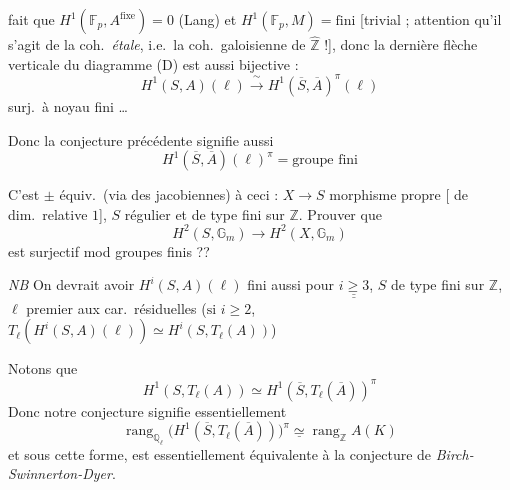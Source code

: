 \documentclass[11pt,a4paper]{article}
\begin{document}
fait que $H^{1}(\mathbb{F}_{p}, A^{\mathrm{fixe}}) = 0$ (Lang) et
$H^{1}(\mathbb{F}_{p}, M) = \text{fini}$ [trivial ; attention qu'il s'agit de
la coh.\ \emph{étale}, i.e.\ la coh.\ galoisienne de $\widehat{\mathbb{Z}}$ !],
donc la dernière flèche verticale du diagramme (D) est aussi bijective :
\[
  H^{1}(S, A)(\ell) \xrightarrow{\;\sim\;} H^{1}(\overline{S}, \overline{A})^{\pi}(\ell)
\]
surj.\ à noyau fini …

Donc la conjecture précédente signifie aussi
\[
  \boxed{\; H^{1}(\overline{S}, \overline{A})(\ell)^{\pi} = \text{groupe fini} \;}
\]

C'est  $\pm$ équiv.\ (via des jacobiennes) à ceci : $X \to S$
morphisme propre [ de dim.\ relative $1$], $S$ régulier et
de type fini sur $\mathbb{Z}$. Prouver que
\[
  H^{2}(S, \mathbb{G}_{m}) \longrightarrow H^{2}(X, \mathbb{G}_{m})
\]
est surjectif mod groupes finis ??

\emph{NB} On devrait avoir $H^{i}(S, A)(\ell)$ fini aussi pour
$\underline{\underline{i \geq 3}}$, $S$ de type fini sur $\mathbb{Z}$, $\ell$
premier aux car.\ résiduelles
 ($\text{si } i \geq 2$, $T_{\ell}(H^{i}(S, A)(\ell)) \simeq H^{i}(S, T_{\ell}(A))$)

Notons que
\[
  H^{1}(S, T_{\ell}(A)) \simeq H^{1}(\overline{S}, T_{\ell}(\overline{A}))^{\pi}
\]
Donc notre conjecture signifie essentiellement
\[
  \operatorname{rang}_{\mathbb{Q}_{\ell}} \bigl( H^{1}(\overline{S}, T_{\ell}(\overline{A})) \bigr)^{\pi} \mathrel{\underline{\simeq}} \operatorname{rang}_{\mathbb{Z}} A(K)
\]
et sous cette forme, est essentiellement équivalente à la conjecture de
\struck{\ill{}} \emph{Birch-Swinnerton-Dyer}.
\end{document}
